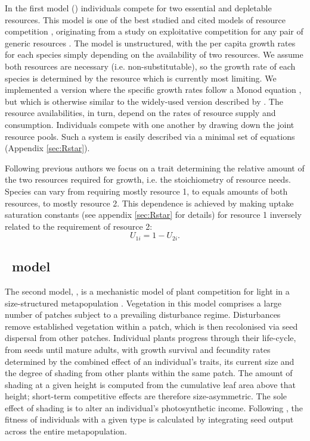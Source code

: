 \documentclass[a4paper,11pt]{article}
\begin{document}
In the first model (\Rstar) individuals compete for two essential and
depletable resources. This model is one of the best studied and cited
models of resource competition \citep{Tilman-1977, Tilman-1982,
  Huisman-2001}, originating from a study on exploitative competition
for any pair of generic resources \citep{Leon-1975}. The model is
unstructured, with the per capita growth rates for each species simply
depending on the availability of two resources.  We assume both
resources are necessary (i.e. non-substitutable), so the growth rate
of each species is determined by the resource which is currently most
limiting.  We implemented a version where the specific growth rates
follow a Monod equation \citet{Huisman-2001}, but which is otherwise
similar to the widely-used version described by \citet{Tilman-1977,
  Tilman-1982}.  The resource availabilities, in turn, depend on the
rates of resource supply and consumption. Individuals compete with one
another by drawing down the joint resource pools. Such a system is
easily described via a minimal set of equations (Appendix
\ref{sec:Rstar}).

Following previous authors \citep{Tilman-1985, Schreiber-2003,
  Fox-2008} we focus on a trait determining the relative amount of the
two resources required for growth, i.e. the stoichiometry of resource
needs. Species can vary from requiring mostly resource 1, to equals
amounts of both resources, to mostly resource 2. This dependence is
achieved by making uptake saturation constants (see appendix
\ref{sec:Rstar} for details) for resource 1 inversely related to the
requirement of resource 2:
\begin{equation}
\label{eq:R3}
U_{1i} = 1 - U_{2i}.
\end{equation}

\subsection{\plant\ model}

The second model, \plant, is a mechanistic model of plant competition
for light in a size-structured metapopulation \citep{Falster-2011,
  Falster-2015}.
%
Vegetation in this model comprises a large number of patches subject
to a prevailing disturbance regime.  Disturbances remove established
vegetation within a patch, which is then recolonised via seed
dispersal from other patches.  Individual plants progress through
their life-cycle, from seeds until mature adults, with growth survival
and fecundity rates determined by the combined effect of an
individual's traits, its current size and the degree of shading from
other plants within the same patch. The amount of shading at a given
height is computed from the cumulative leaf area above that height;
short-term competitive effects are therefore size-asymmetric. The sole
effect of shading is to alter an individual's photosynthetic
income. Following \citep{Falster-2015}, the fitness of individuals
with a given type is calculated by integrating seed output across the
entire metapopulation.
\end{document}
